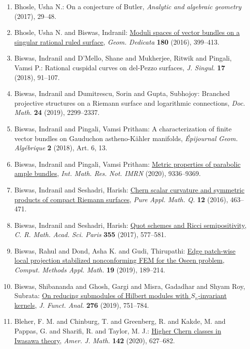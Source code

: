 \begin{enumerate}
\item Bhosle, Usha N.: On a conjecture of {B}utler, \emph{Analytic and algebraic geometry} {\bf } (2017), 29--48.
\item Bhosle, Usha N. and Biswas, Indranil: \href{https://doi.org/10.1007/s10711-015-0108-2}{Moduli spaces of vector bundles on a singular rational ruled
surface}, \emph{Geom. Dedicata} {\bf 180} (2016), 399--413.
\item Biswas, Indranil and D'Mello, Shane and Mukherjee, Ritwik and
Pingali, Vamsi P.: Rational cuspidal curves on del-{P}ezzo surfaces, \emph{J. Singul.} {\bf 17} (2018), 91--107.
\item Biswas, Indranil and Dumitrescu, Sorin and Gupta, Subhojoy: Branched projective structures on a {R}iemann surface and
logarithmic connections, \emph{Doc. Math.} {\bf 24} (2019), 2299--2337.
\item Biswas, Indranil and Pingali, Vamsi Pritham: A characterization of finite vector bundles on {G}auduchon
astheno-{K}\"{a}hler manifolds, \emph{\'{E}pijournal Geom. Alg\'{e}brique} {\bf 2} (2018), Art. 6, 13.
\item Biswas, Indranil and Pingali, Vamsi Pritham: \href{https://doi.org/10.1093/imrn/rny259}{Metric properties of parabolic ample bundles}, \emph{Int. Math. Res. Not. IMRN} {\bf } (2020), 9336--9369.
\item Biswas, Indranil and Seshadri, Harish: \href{https://doi.org/10.4310/PAMQ.2016.v12.n4.a1}{Chern scalar curvature and symmetric products of compact
{R}iemann surfaces}, \emph{Pure Appl. Math. Q.} {\bf 12} (2016), 463--471.
\item Biswas, Indranil and Seshadri, Harish: \href{https://doi.org/10.1016/j.crma.2017.03.012}{Quot schemes and {R}icci semipositivity}, \emph{C. R. Math. Acad. Sci. Paris} {\bf 355} (2017), 577--581.
\item Biswas, Rahul and Dond, Asha K. and Gudi, Thirupathi: \href{https://doi.org/10.1515/cmam-2018-0020}{Edge patch-wise local projection stabilized nonconforming
{FEM} for the {O}seen problem}, \emph{Comput. Methods Appl. Math.} {\bf 19} (2019), 189--214.
\item Biswas, Shibananda and Ghosh, Gargi and Misra, Gadadhar and
Shyam Roy, Subrata: \href{https://doi.org/10.1016/j.jfa.2018.10.025}{On reducing submodules of {H}ilbert modules with
{${S}_n$}-invariant kernels}, \emph{J. Funct. Anal.} {\bf 276} (2019), 751--784.
\item Bleher, F. M. and Chinburg, T. and Greenberg, R. and Kakde, M.
and Pappas, G. and Sharifi, R. and Taylor, M. J.: \href{https://doi.org/10.1353/ajm.2020.0017}{Higher {C}hern classes in {I}wasawa theory}, \emph{Amer. J. Math.} {\bf 142} (2020), 627--682.

\end{enumerate}
